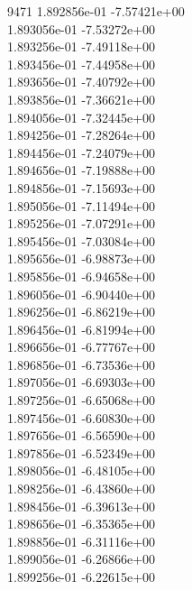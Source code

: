 9471	1.892856e-01	-7.57421e+00	\\ 	1.893056e-01	-7.53272e+00	\\ 	1.893256e-01	-7.49118e+00	\\ 	1.893456e-01	-7.44958e+00	\\ 	1.893656e-01	-7.40792e+00	\\ 	1.893856e-01	-7.36621e+00	\\ 	1.894056e-01	-7.32445e+00	\\ 	1.894256e-01	-7.28264e+00	\\ 	1.894456e-01	-7.24079e+00	\\ 	1.894656e-01	-7.19888e+00	\\ 	1.894856e-01	-7.15693e+00	\\ 	1.895056e-01	-7.11494e+00	\\ 	1.895256e-01	-7.07291e+00	\\ 	1.895456e-01	-7.03084e+00	\\ 	1.895656e-01	-6.98873e+00	\\ 	1.895856e-01	-6.94658e+00	\\ 	1.896056e-01	-6.90440e+00	\\ 	1.896256e-01	-6.86219e+00	\\ 	1.896456e-01	-6.81994e+00	\\ 	1.896656e-01	-6.77767e+00	\\ 	1.896856e-01	-6.73536e+00	\\ 	1.897056e-01	-6.69303e+00	\\ 	1.897256e-01	-6.65068e+00	\\ 	1.897456e-01	-6.60830e+00	\\ 	1.897656e-01	-6.56590e+00	\\ 	1.897856e-01	-6.52349e+00	\\ 	1.898056e-01	-6.48105e+00	\\ 	1.898256e-01	-6.43860e+00	\\ 	1.898456e-01	-6.39613e+00	\\ 	1.898656e-01	-6.35365e+00	\\ 	1.898856e-01	-6.31116e+00	\\ 	1.899056e-01	-6.26866e+00	\\ 	1.899256e-01	-6.22615e+00	\\ \hline
